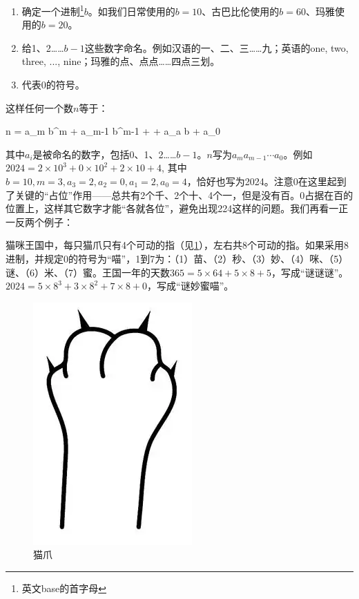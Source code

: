 \documentclass[b5paper]{ctexart}
\begin{document}
\begin{enumerate}[1)]
\item 确定一个进制\footnote{英文base的首字母}$b$。如我们日常使用的$b = 10$、古巴比伦使用的$b = 60$、玛雅使用的$b = 20$。
\item 给1、2……$b-1$这些数字命名。例如汉语的一、二、三……九；英语的one, two, three, ..., nine；玛雅的点、点点……四点三划。
\item 代表0的符号。
\end{enumerate}

这样任何一个数$n$等于：

\be
n = a_m b^m + a_{m-1} b^{m-1} + \cdots + a_a b + a_0
\label{eq:pos-rep}
\ee

其中$a_i$是被命名的数字，包括0、1、2……$b-1$。$n$写为$a_ma_{m-1} \cdots a_0$。例如$2024 = 2 \times 10^3 + 0 \times 10^2 + 2 \times 10 + 4$, 其中$b = 10, m = 3, a_3 = 2, a_2 = 0, a_1 = 2, a_0 = 4$，恰好也写为2024。注意0在这里起到了关键的“占位”作用——总共有2个千、2个十、4个一，但是没有百。0占据在百的位置上，这样其它数字才能“各就各位”，避免出现224这样的问题。我们再看一正一反两个例子：

\begin{example}
猫咪王国中，每只猫爪只有4个可动的指（见\cref{fig:cat-paw}），左右共8个可动的指。如果采用8进制，并规定0的符号为“喵”，1到7为：（1）苗、（2）秒、（3）妙、（4）咪、（5）谜、（6）米、（7）蜜。王国一年的天数$365 = 5 \times 64 + 5 \times 8 + 5$，写成“谜谜谜”。$2024 = 5 \times 8^3 + 3 \times 8^2 + 7 \times 8 + 0$，写成“谜妙蜜喵”。

\begin{figure}[htbp]
 \centering
 \includegraphics[scale=0.6]{img/cat-paw}
 \caption{猫爪}
 \label{fig:cat-paw}
\end{figure}

\end{example}
\end{document}
